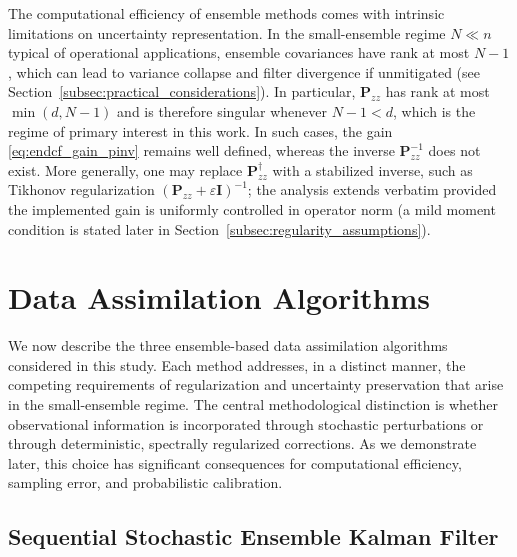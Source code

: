 \documentclass[11pt,a4paper]{article}
\begin{document}
The computational efficiency of ensemble methods comes with intrinsic limitations on uncertainty representation. In the small-ensemble regime $N\ll n$ typical of operational applications, ensemble covariances have rank at most $N-1$, which can lead to variance collapse and filter divergence if unmitigated (see Section~\ref{subsec:practical_considerations}). In particular, $\mathbf{P}_{zz}$ has rank at most $\min(d,N-1)$ and is therefore singular whenever $N-1<d$, which is the regime of primary interest in this work. In such cases, the gain \eqref{eq:endcf_gain_pinv} remains well defined, whereas the inverse $\mathbf{P}_{zz}^{-1}$ does not exist. More generally, one may replace $\mathbf{P}_{zz}^{\dagger}$ with a stabilized inverse, such as Tikhonov regularization $(\mathbf{P}_{zz}+\varepsilon\mathbf{I})^{-1}$; the analysis extends verbatim provided the implemented gain is uniformly controlled in operator norm (a mild moment condition is stated later in Section~\ref{subsec:regularity_assumptions}).




\section{Data Assimilation Algorithms}\label{sec:algorithms_uq}

We now describe the three ensemble-based data assimilation algorithms considered in this study. Each method addresses, in a distinct manner, the competing requirements of regularization and uncertainty preservation that arise in the small-ensemble regime. The central methodological distinction is whether observational information is incorporated through stochastic perturbations or through deterministic, spectrally regularized corrections. As we demonstrate later, this choice has significant consequences for computational efficiency, sampling error, and probabilistic calibration.

\subsection{Sequential Stochastic Ensemble Kalman Filter}
\end{document}
